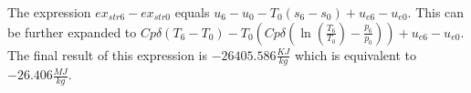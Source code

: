 The expression \( ex_{str6} - ex_{str0} \) equals \( u_6 - u_0 - T_0 (s_6 - s_0) + u_{e6} - u_{e0} \). This can be further expanded to \( Cp\delta (T_6 - T_0) - T_0 \left( Cp\delta \left( \ln \left( \frac{T_6}{T_0} \right) - \frac{p_6}{p_0} \right) \right) + u_{e6} - u_{e0} \). The final result of this expression is \(-26405.586 \frac{KJ}{kg}\) which is equivalent to \(-26.406 \frac{MJ}{kg}\).